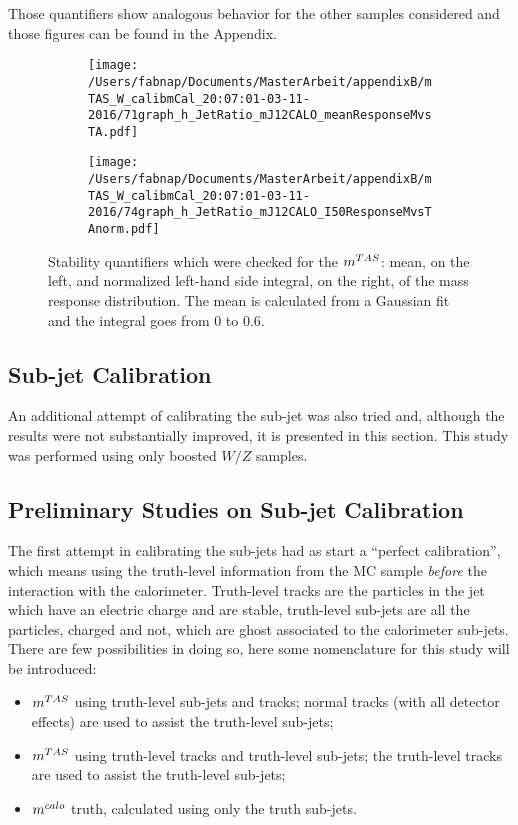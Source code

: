 Those quantifiers show analogous behavior for the other samples considered and those figures can be found in the Appendix.

\begin{figure}
    \centering
    \begin{subfigure}[b]{0.45\textwidth}
	\centering
        \texttt{[image: /Users/fabnap/Documents/MasterArbeit/appendixB/mTAS\_W\_calibmCal\_20:07:01-03-11-2016/71graph\_h\_JetRatio\_mJ12CALO\_meanResponseMvsTA.pdf]}
    \end{subfigure}
    \begin{subfigure}[b]{0.45\textwidth}
	\centering
        \texttt{[image: /Users/fabnap/Documents/MasterArbeit/appendixB/mTAS\_W\_calibmCal\_20:07:01-03-11-2016/74graph\_h\_JetRatio\_mJ12CALO\_I50ResponseMvsTAnorm.pdf]}
 
    \end{subfigure}
    \caption[Mean and left-hand side integral for boosted $W/Z$]{Stability quantifiers which were checked for the $m^{TAS}$: mean, on the left, and normalized left-hand side integral, on the right, of the mass response distribution. The mean is calculated from a Gaussian fit and the integral goes from 0 to 0.6.} 
    \label{fig:meanandtail}
\end{figure}

\subsection{Sub-jet Calibration}

An additional attempt of calibrating the sub-jet was also tried and, although the results were not substantially improved, it is presented in this section. This study was performed using only boosted $W/Z$ samples.

\subsection{Preliminary Studies on Sub-jet Calibration}
The first attempt in calibrating the sub-jets had as start a ``perfect calibration'', which means using the truth-level information from the MC sample \textit{before} the interaction with the calorimeter.
Truth-level tracks are the particles in the jet which have an electric charge and are stable, truth-level sub-jets are all the particles, charged and not, which are ghost associated to the calorimeter sub-jets.
There are few possibilities in doing so, here some nomenclature for this study will be introduced:
\begin{itemize}
 \item $m^{TAS}$ using truth-level sub-jets and tracks; normal tracks (with all detector effects) are used to assist the truth-level sub-jets;
 \item $m^{TAS}$ using truth-level tracks and truth-level sub-jets; the truth-level tracks are used to assist the truth-level sub-jets;
 \item $m^{calo}$ truth, calculated using only the truth sub-jets.
\end{itemize}


